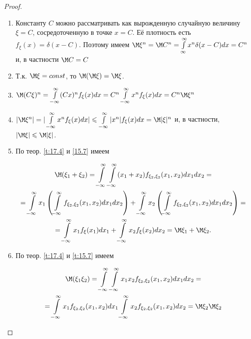 \begin{proof}
	\begin{enumerate}
		\item Константу $C$ можно рассматривать как вырожденную случайную величину $\xi = C$, сосредоточенную в точке $x = C$. Её плотность есть $f_{\xi}(x)=\delta(x-C)$. Поэтому имеем $\M\xi^n=\M C^n=\int\limits^{\infty}_{\infty} x^n\delta(x-C)dx=C^n$ и, в частности $\M C=C$

		\item Т.к. $\M\xi=const$, то $\M(\M\xi)=\M\xi$.

		\item $\M(C\xi)^n=\int\limits^{\infty}_{-\infty}(Cx)^nf_{\xi}(x)dx=C^n\int\limits^{\infty}_{-\infty}x^nf_{\xi}(x)dx=C^n\M \xi^n$
		
		\item $|\M\xi^n|=|\int\limits^{\infty}_{-\infty}x^nf_{\xi}(x)dx|\leqslant\int\limits^{\infty}_{-\infty}|x^n|f_{\xi}(x)dx=
		\M|\xi|^n$ и, в частности, $|\M\xi|\leqslant\M|\xi|$.

		\item По теор. \ref{t:17.4} и \ref{15.7} имеем

			\begin{gather*}
				\M(\xi_1+\xi_2)=
				\int\limits^{\infty}_{-\infty}
				\int\limits^{\infty}_{-\infty}
				(x_1+x_2)
				f_{\xi_2,\xi_2}(x_1,x_2)dx_1dx_2
				=\\=
				\int\limits^{\infty}_{-\infty}
				x_1
				\left(\int\limits^{\infty}_{-\infty} 
				f_{\xi_2,\xi_2}(x_1,x_2)dx_1dx_2
				\right)
				+
				\int\limits^{\infty}_{-\infty}
				x_2
				\left(\int\limits^{\infty}_{-\infty} 
				f_{\xi_2,\xi_2}(x_1,x_2)dx_1dx_2
				\right)
				=\\=
				\int\limits^{\infty}_{-\infty}
				x_1 f_{\xi}(x_1)dx_1+
				\int\limits^{\infty}_{-\infty}
				x_2 f_{\xi}(x_2)dx_2=
				\M\xi_1+\M\xi_2.
			\end{gather*}
		\item По теор. \ref{t:17.4} и \ref{t:15.7} имеем

			\begin{gather*}
				\M(\xi_1\xi_2)=
				\int\limits^{\infty}_{-\infty}\int\limits^{\infty}_{-\infty}
				x_1x_2f_{\xi_2,\xi_2}(x_1,x_2)dx_1dx_2
				=\\=
				\int\limits^{\infty}_{-\infty}
				x_1f_{\xi_2,\xi_2}(x_1,x_2)dx_1 
				\int\limits^{\infty}_{-\infty}
				x_2f_{\xi_2,\xi_2}(x_1,x_2)dx_2=
				\M\xi_2\M\xi_2
			\end{gather*}
	\end{enumerate}
\end{proof}

